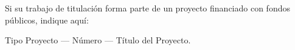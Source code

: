 \thispagestyle{empty}

\noindent Si su trabajo de titulación forma parte de un proyecto financiado con fondos públicos,
indique aquí:

\vspace*{0.5cm}

\noindent Tipo Proyecto --- Número --- Título del Proyecto.





